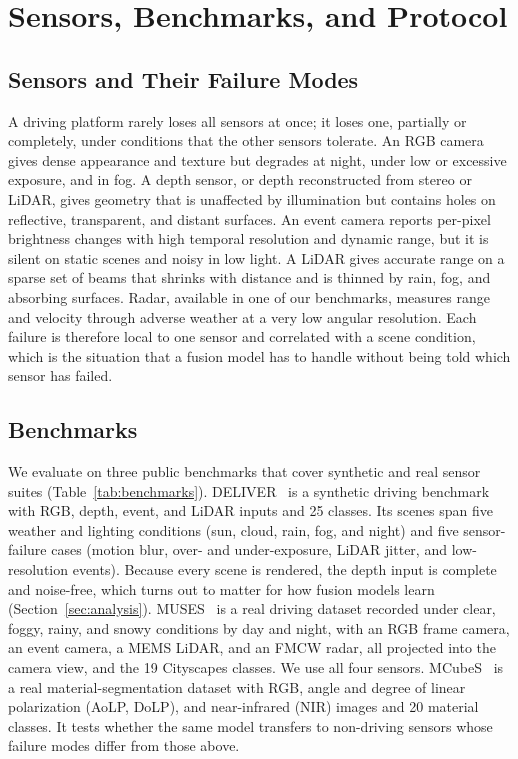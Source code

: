 \section{Sensors, Benchmarks, and Protocol}\label{sec:sensors}

\subsection{Sensors and Their Failure Modes}
A driving platform rarely loses all sensors at once; it loses one, partially or completely, under conditions that the other sensors tolerate. An RGB camera gives dense appearance and texture but degrades at night, under low or excessive exposure, and in fog. A depth sensor, or depth reconstructed from stereo or LiDAR, gives geometry that is unaffected by illumination but contains holes on reflective, transparent, and distant surfaces. An event camera reports per-pixel brightness changes with high temporal resolution and dynamic range, but it is silent on static scenes and noisy in low light. A LiDAR gives accurate range on a sparse set of beams that shrinks with distance and is thinned by rain, fog, and absorbing surfaces. Radar, available in one of our benchmarks, measures range and velocity through adverse weather at a very low angular resolution. Each failure is therefore local to one sensor and correlated with a scene condition, which is the situation that a fusion model has to handle without being told which sensor has failed.

\subsection{Benchmarks}
We evaluate on three public benchmarks that cover synthetic and real sensor suites (Table~\ref{tab:benchmarks}).
DELIVER~\cite{cmnext2023} is a synthetic driving benchmark with RGB, depth, event, and LiDAR inputs and 25 classes. Its scenes span five weather and lighting conditions (sun, cloud, rain, fog, and night) and five sensor-failure cases (motion blur, over- and under-exposure, LiDAR jitter, and low-resolution events). Because every scene is rendered, the depth input is complete and noise-free, which turns out to matter for how fusion models learn (Section~\ref{sec:analysis}).
MUSES~\cite{muses2024} is a real driving dataset recorded under clear, foggy, rainy, and snowy conditions by day and night, with an RGB frame camera, an event camera, a MEMS LiDAR, and an FMCW radar, all projected into the camera view, and the 19 Cityscapes classes. We use all four sensors.
MCubeS~\cite{mcubes2022} is a real material-segmentation dataset with RGB, angle and degree of linear polarization (AoLP, DoLP), and near-infrared (NIR) images and 20 material classes. It tests whether the same model transfers to non-driving sensors whose failure modes differ from those above.

